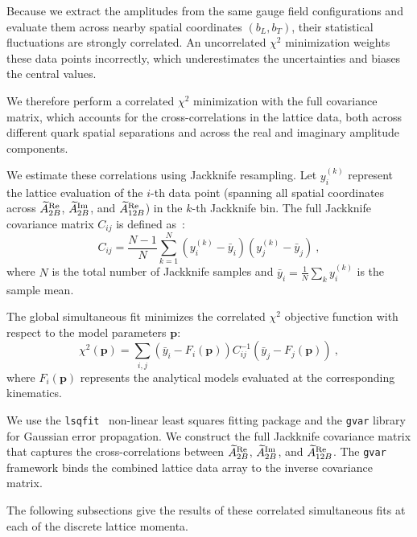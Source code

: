 Because we extract the amplitudes from the same gauge field configurations and evaluate them across nearby spatial coordinates $(b_L, b_T)$, their statistical fluctuations are strongly correlated. An uncorrelated $\chi^2$ minimization weights these data points incorrectly, which underestimates the uncertainties and biases the central values.

We therefore perform a correlated $\chi^2$ minimization with the full covariance matrix, which accounts for the cross-correlations in the lattice data, both across different quark spatial separations and across the real and imaginary amplitude components. 

We estimate these correlations using Jackknife resampling. Let $y_i^{(k)}$ represent the lattice evaluation of the $i$-th data point (spanning all spatial coordinates across $\widetilde{A}_{2B}^{\text{Re}}$, $\widetilde{A}_{2B}^{\text{Im}}$, and $\widetilde{A}_{12B}^{\text{Re}}$) in the $k$-th Jackknife bin. The full Jackknife covariance matrix $C_{ij}$ is defined as~\cite{Boram2011Covariance}:
\begin{equation}
    C_{ij} = \frac{N-1}{N} \sum_{k=1}^{N} \left( y_i^{(k)} - \bar{y}_i \right) \left( y_j^{(k)} - \bar{y}_j \right) \ ,
\end{equation}
where $N$ is the total number of Jackknife samples and $\bar{y}_i = \frac{1}{N}\sum_k y_i^{(k)}$ is the sample mean. 

The global simultaneous fit minimizes the correlated $\chi^2$ objective function with respect to the model parameters $\mathbf{p}$:
\begin{equation}
    \chi^2(\mathbf{p}) = \sum_{i,j} \left( \bar{y}_i - F_i(\mathbf{p}) \right) C_{ij}^{-1} \left( \bar{y}_j - F_j(\mathbf{p}) \right) \ ,
\end{equation}
where $F_i(\mathbf{p})$ represents the analytical models evaluated at the corresponding kinematics. 

We use the \texttt{lsqfit}~\cite{Lepage:2001ym} non-linear least squares fitting package and the \texttt{gvar} library for Gaussian error propagation. We construct the full Jackknife covariance matrix that captures the cross-correlations between $\widetilde{A}_{2B}^{\text{Re}}$, $\widetilde{A}_{2B}^{\text{Im}}$, and $\widetilde{A}_{12B}^{\text{Re}}$. The \texttt{gvar} framework binds the combined lattice data array to the inverse covariance matrix.

The following subsections give the results of these correlated simultaneous fits at each of the discrete lattice momenta.

